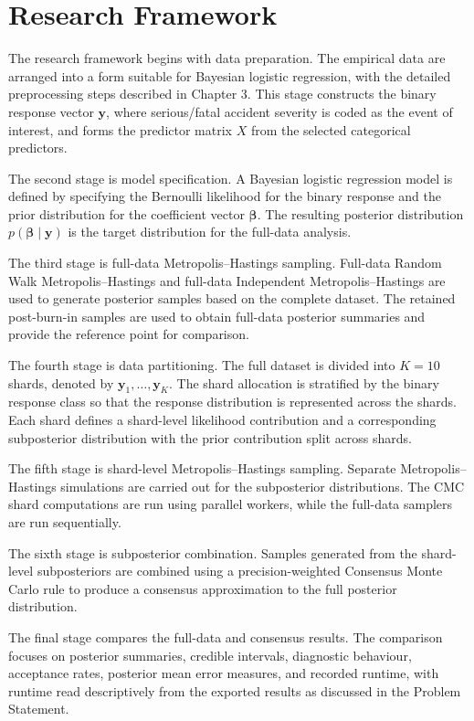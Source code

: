 \section{Research Framework}

The research framework begins with data preparation. The empirical data are arranged into a form suitable for Bayesian logistic regression, with the detailed preprocessing steps described in Chapter 3. This stage constructs the binary response vector $\mathbf{y}$, where serious/fatal accident severity is coded as the event of interest, and forms the predictor matrix $X$ from the selected categorical predictors.

The second stage is model specification. A Bayesian logistic regression model is defined by specifying the Bernoulli likelihood for the binary response and the prior distribution for the coefficient vector $\boldsymbol{\beta}$. The resulting posterior distribution $p(\boldsymbol{\beta}\mid \mathbf{y})$ is the target distribution for the full-data analysis.

The third stage is full-data Metropolis--Hastings sampling. Full-data Random Walk Metropolis--Hastings and full-data Independent Metropolis--Hastings are used to generate posterior samples based on the complete dataset. The retained post-burn-in samples are used to obtain full-data posterior summaries and provide the reference point for comparison.

The fourth stage is data partitioning. The full dataset is divided into $K=10$ shards, denoted by $\mathbf{y}_1,\ldots,\mathbf{y}_K$. The shard allocation is stratified by the binary response class so that the response distribution is represented across the shards. Each shard defines a shard-level likelihood contribution and a corresponding subposterior distribution with the prior contribution split across shards.

The fifth stage is shard-level Metropolis--Hastings sampling. Separate Metropolis--Hastings simulations are carried out for the subposterior distributions. The CMC shard computations are run using parallel workers, while the full-data samplers are run sequentially.

The sixth stage is subposterior combination. Samples generated from the shard-level subposteriors are combined using a precision-weighted Consensus Monte Carlo rule to produce a consensus approximation to the full posterior distribution.

The final stage compares the full-data and consensus results. The comparison focuses on posterior summaries, credible intervals, diagnostic behaviour, acceptance rates, posterior mean error measures, and recorded runtime, with runtime read descriptively from the exported results as discussed in the Problem Statement.

